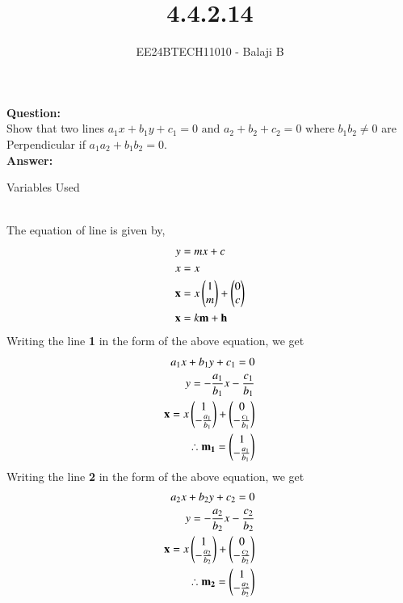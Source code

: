 \documentclass[journal]{IEEEtran}
\begin{document}

\vspace{3cm}

\title{4.4.2.14}
\author{EE24BTECH11010 - Balaji B}
{\let\newpage\relax\maketitle}
\textbf{Question:}\\
Show that two lines $a_1x+b_1y+c_1 = 0 \text{ and } a_2+b_2+c_2=0 \text{ where } b_1b_2 \neq 0$ are Perpendicular if $a_1a_2 + b_1b_2 = 0.$\\
\textbf{Answer:}\\
\begin{table}[h!]    
  \centering
  
  \caption{Variables Used}
  \label{tab1-1.9-6}
  \end{table}\\
The equation of line is given by,
\begin{align}
    y &= mx + c \\
    x &= x\\
    \mathbf{x} &= x\begin{pmatrix}1 \\ m\end{pmatrix} + \begin{pmatrix}0\\c\end{pmatrix}\\
    \mathbf{x} &= k\mathbf{m} + \mathbf{h}\\
\end{align}
Writing the line \textbf{1} in the form of the above equation, we get
\begin{align}
    a_1x+b_1y+c_1 = 0\\
    y = -\frac{a_1}{b_1} x -\frac{c_1}{b_1}\\
    \mathbf{x} = x\begin{pmatrix}1 \\ -\frac{a_1}{b_1}\end{pmatrix} + \begin{pmatrix}0 \\ -\frac{c_1}{b_1}\end{pmatrix}\\
\therefore \mathbf{m_1} = \begin{pmatrix}1\\-\frac{a_1}{b_1}\end{pmatrix}
\end{align}
Writing the line \textbf{2} in the form of the above equation, we get
\begin{align}
    a_2x+b_2y+c_2 = 0\\
    y = -\frac{a_2}{b_2} x -\frac{c_2}{b_2}\\
    \mathbf{x} = x\begin{pmatrix}1 \\ -\frac{a_2}{b_2}\end{pmatrix} + \begin{pmatrix}0 \\ -\frac{c_2}{b_2}\end{pmatrix}\\
\therefore \mathbf{m_2} = \begin{pmatrix}1\\-\frac{a_2}{b_2}\end{pmatrix}
\end{align}
\end{document}

